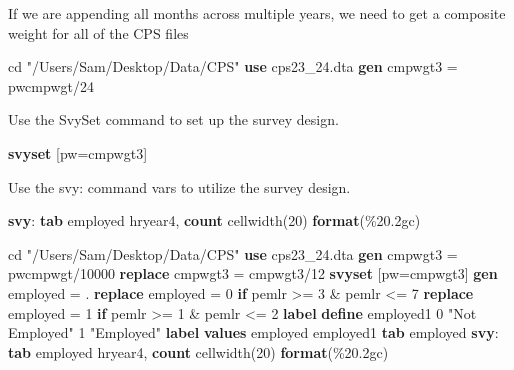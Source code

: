 \documentclass[
]{book}
\newenvironment{Shaded}{\begin{snugshade}}{\end{snugshade}}
\newcommand{\FunctionTok}[1]{\textcolor[rgb]{0.13,0.29,0.53}{\textbf{#1}}}
\newcommand{\KeywordTok}[1]{\textcolor[rgb]{0.13,0.29,0.53}{\textbf{#1}}}
\newcommand{\NormalTok}[1]{#1}
\newcommand{\StringTok}[1]{\textcolor[rgb]{0.31,0.60,0.02}{#1}}
\begin{document}
If we are appending all months across multiple years, we need to get a composite weight for all of the CPS files

\begin{Shaded}
\begin{Highlighting}[]
\NormalTok{cd }\StringTok{"/Users/Sam/Desktop/Data/CPS"}
\KeywordTok{use}\NormalTok{ cps23\_24.dta}
\KeywordTok{gen}\NormalTok{ cmpwgt3 = pwcmpwgt/24}
\end{Highlighting}
\end{Shaded}

Use the SvySet command to set up the survey design.

\begin{Shaded}
\begin{Highlighting}[]
    \KeywordTok{svyset}\NormalTok{ [pw=cmpwgt3]}
\end{Highlighting}
\end{Shaded}

Use the svy: command vars to utilize the survey design.

\begin{Shaded}
\begin{Highlighting}[]
    \KeywordTok{svy}\NormalTok{: }\KeywordTok{tab}\NormalTok{ employed hryear4, }\FunctionTok{count}\NormalTok{ cellwidth(20) }\KeywordTok{format}\NormalTok{(\%20.2gc)}
\end{Highlighting}
\end{Shaded}

\begin{Shaded}
\begin{Highlighting}[]
\NormalTok{cd }\StringTok{"/Users/Sam/Desktop/Data/CPS"}
\KeywordTok{use}\NormalTok{ cps23\_24.dta}
\KeywordTok{gen}\NormalTok{ cmpwgt3 = pwcmpwgt/10000}
\KeywordTok{replace}\NormalTok{ cmpwgt3 = cmpwgt3/12}
\KeywordTok{svyset}\NormalTok{ [pw=cmpwgt3]}
\KeywordTok{gen}\NormalTok{ employed = .}
\KeywordTok{replace}\NormalTok{ employed = 0 }\KeywordTok{if}\NormalTok{ pemlr \textgreater{}= 3 \& pemlr \textless{}= 7}
\KeywordTok{replace}\NormalTok{ employed = 1 }\KeywordTok{if}\NormalTok{ pemlr \textgreater{}= 1 \& pemlr \textless{}= 2}
\KeywordTok{label} \KeywordTok{define}\NormalTok{ employed1 0 }\StringTok{"Not Employed"}\NormalTok{ 1 }\StringTok{"Employed"}
\KeywordTok{label} \KeywordTok{values}\NormalTok{ employed employed1}
\KeywordTok{tab}\NormalTok{ employed}
\KeywordTok{svy}\NormalTok{: }\KeywordTok{tab}\NormalTok{ employed hryear4, }\FunctionTok{count}\NormalTok{ cellwidth(20) }\KeywordTok{format}\NormalTok{(\%20.2gc)}
\end{Highlighting}
\end{Shaded}
\end{document}
